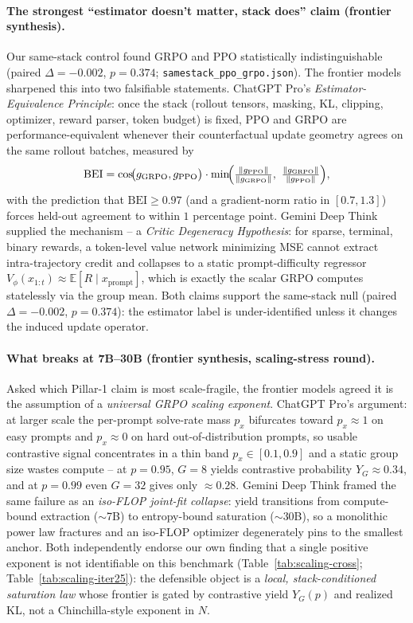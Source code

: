 \documentclass{article}
\providecommand{\tableref}[1]{Table~\ref{#1}}
\begin{document}
\paragraph{The strongest ``estimator doesn't matter, stack does'' claim (frontier synthesis).}
Our same-stack control found GRPO and PPO statistically indistinguishable
(paired $\Delta = -0.002$, $p = 0.374$; \texttt{samestack\_ppo\_grpo.json}). The frontier models sharpened this
into two falsifiable statements. ChatGPT Pro's \emph{Estimator-Equivalence
Principle}: once the stack (rollout tensors, masking, KL, clipping, optimizer,
reward parser, token budget) is fixed, PPO and GRPO are performance-equivalent
whenever their counterfactual update geometry agrees on the same rollout
batches, measured by
\begin{equation}
  \label{eq:frontier-bei}
  \mathrm{BEI} = \cos\!\bigl(g_{\mathrm{GRPO}}, g_{\mathrm{PPO}}\bigr)\cdot
     \min\!\Bigl(
        \tfrac{\|g_{\mathrm{PPO}}\|}{\|g_{\mathrm{GRPO}}\|},\
        \tfrac{\|g_{\mathrm{GRPO}}\|}{\|g_{\mathrm{PPO}}\|}
     \Bigr),
\end{equation}
with the prediction that $\mathrm{BEI}\ge 0.97$ (and a gradient-norm ratio in
$[0.7,1.3]$) forces held-out agreement to within $1$ percentage point. Gemini
Deep Think supplied the mechanism -- a \emph{Critic Degeneracy Hypothesis}:
for sparse, terminal, binary rewards, a token-level value network minimizing
MSE cannot extract intra-trajectory credit and collapses to a static
prompt-difficulty regressor $V_\phi(x_{1:t}) \approx \mathbb{E}[R \mid
x_{\mathrm{prompt}}]$, which is exactly the scalar GRPO computes statelessly
via the group mean. Both claims support the same-stack null (paired
$\Delta=-0.002$, $p=0.374$): the estimator label
is under-identified unless it changes the induced update operator.

\paragraph{What breaks at 7B--30B (frontier synthesis, scaling-stress round).}
Asked which Pillar-1 claim is most scale-fragile, the frontier models agreed
it is the assumption of a \emph{universal GRPO scaling exponent}. ChatGPT Pro's
argument: at larger scale the per-prompt solve-rate mass $p_x$ bifurcates
toward $p_x\!\approx\!1$ on easy prompts and $p_x\!\approx\!0$ on hard
out-of-distribution prompts, so usable contrastive signal concentrates in a
thin band $p_x\in[0.1,0.9]$ and a static group size wastes compute -- at
$p=0.95$, $G=8$ yields contrastive probability $Y_G\approx 0.34$, and at
$p=0.99$ even $G=32$ gives only $\approx 0.28$. Gemini Deep Think framed the
same failure as an \emph{iso-FLOP joint-fit collapse}: yield transitions from
compute-bound extraction ($\sim$7B) to entropy-bound saturation ($\sim$30B),
so a monolithic power law fractures and an iso-FLOP optimizer degenerately
pins to the smallest anchor. Both independently endorse our own finding that
a single positive exponent is not identifiable on this benchmark
(\tableref{tab:scaling-cross}; \tableref{tab:scaling-iter25}): the defensible
object is a \emph{local, stack-conditioned saturation law} whose frontier is
gated by contrastive yield $Y_G(p)$ and realized KL, not a Chinchilla-style
exponent in $N$.
\end{document}
